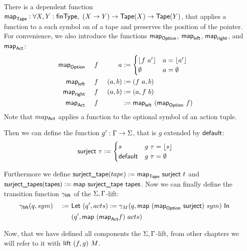 \documentclass{psartcl}
\begin{document}
There is a dependent function $\textsf{map}_{\textsf{Tape}}:\forall X, Y:\textsf{finType},~(X \rightarrow Y) \rightarrow \textsf{Tape}(X) \rightarrow \textsf{Tape}(Y)$, that applies a function to a each symbol
on of a tape and preserves the position of the pointer.
For convenience, we also introduce the functions $\textsf{map}_{\textsf{Option}}$, $\textsf{map}_{\textsf{left}}$, $\textsf{map}_{\textsf{right}}$, and $\textsf{map}_{\textsf{Act}}$:
\begin{alignat*}{4}
  \textsf{map}_{\textsf{Option}} &&~ f && a &:=
    \begin{cases}
      \left\lfloor {f~a'}\right\rfloor & a = \left\lfloor {a'}\right\rfloor \\
      \emptyset       & a = \emptyset
    \end{cases} \\
    \textsf{map}_{\textsf{left}}  &&~ f &&~ (a, b) &:= (f~a, b) \\
    \textsf{map}_{\textsf{right}} &&~ f &&~ (a, b) &:= (a, f~b) \\
    \textsf{map}_{\textsf{Act}}   &&~ f &&         &:= \textsf{map}_{\textsf{left}}~(\textsf{map}_{\textsf{Option}}~f)
\end{alignat*}
Note that $map_{\textsf{Act}}$ applies a function to the optional symbol of an action tuple.

Then we can define the function $g' : \Gamma \rightarrow \Sigma$, that is $g$ extended by $\textsf{default}$:
\begin{align*}
  \textsf{surject}~\tau :=
  \begin{cases}
    s            & g~\tau = \left\lfloor {s}\right\rfloor \\
    \textsf{default} & g~\tau = \emptyset
  \end{cases}
\end{align*}

Furthermore we define $\textsf{surject\_tape}(tape) := \textsf{map}_{\textsf{Tape}}~\textsf{surject}~t$ and
$\textsf{surject\_tapes}(\textsf{tapes}) := \textsf{map}~\textsf{surject\_tape}~\textsf{tapes}$.
Now we can finally define the transition function $\gamma_{\textsf{lift}}$ of the $\Sigma,\Gamma$-lift:
\begin{alignat*}{3}
  &\gamma_{\textsf{lift}} (q, sym) &~:=~& \textsf{Let}~(q', acts) := \gamma_M(q, \textsf{map}~(\textsf{map}_{\textsf{Option}}~\textsf{surject})~sym)~\textsf{In}~\\
  &                          &~  ~& (q', \textsf{map}~(\textsf{map}_{\textsf{Act}} f)~acts)
\end{alignat*}

Now, that we have defined all components the $\Sigma,\Gamma$-lift, from other chapters we will refer to it with $\textsf{lift}~(f,g)~M$.
\end{document}
